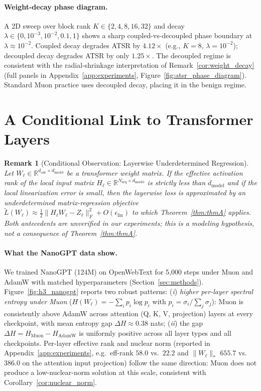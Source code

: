 \documentclass{article}
\newtheorem{remark}{Remark}
\begin{document}
\paragraph{Weight-decay phase diagram.}
A 2D sweep over block rank $K\in\{2,4,8,16,32\}$ and decay $\lambda\in\{0,10^{-3},10^{-2},0.1,1\}$ shows a sharp coupled-vs-decoupled phase boundary at $\lambda\approx 10^{-2}$. Coupled decay degrades ATSR by $4.12\times$ (e.g., $K=8$, $\lambda=10^{-2}$); decoupled decay degrades ATSR by only $1.25\times$. The decoupled regime is consistent with the radial-shrinkage interpretation of Remark~\ref{cor:weight_decay} (full panels in Appendix~\ref{app:experiments}, Figure~\ref{fig:atsr_phase_diagram}). Standard Muon practice \citep{liu2025moonlight,jordan2024muon} uses decoupled decay, placing it in the benign regime.

\section{A Conditional Link to Transformer Layers}
\label{sec:transformer}

\begin{remark}[Conditional Observation: Layerwise Underdetermined Regression]
\label{obs:transformer_link}
Let $W_\ell \in \mathbb{R}^{d_{\mathrm{out}} \times d_{\mathrm{model}}}$ be a transformer weight matrix. \emph{If} the effective activation rank of the local input matrix $H_\ell\in\mathbb R^{N_{\mathrm{seq}}\times d_{\mathrm{model}}}$ is strictly less than $d_{\mathrm{model}}$ and \emph{if} the local linearization error is small, then the layerwise loss is approximated by an underdetermined matrix-regression objective $\tilde L(W_\ell)\approx\tfrac12\|H_\ell W_\ell - Z_\ell\|_F^2 + O(\epsilon_{\mathrm{lin}})$ to which Theorem~\ref{thm:thmA} applies. Both antecedents are unverified in our experiments; this is a modeling hypothesis, not a consequence of Theorem~\ref{thm:thmA}.
\end{remark}

\paragraph{What the NanoGPT data show.}
We trained NanoGPT (124M) on OpenWebText for 5{,}000 steps under Muon and AdamW with matched hyperparameters (Section~\ref{sec:methods}). Figure~\ref{fig:h3_nanogpt} reports two robust patterns: (\emph{i}) \emph{higher per-layer spectral entropy under Muon} ($H(W_\ell) = -\sum_i p_i\log p_i$ with $p_i=\sigma_i/\sum_j\sigma_j$): Muon is consistently above AdamW across attention (Q, K, V, projection) layers at every checkpoint, with mean entropy gap $\Delta H \approx 0.38$ nats; (\emph{ii}) the gap $\Delta H = H_{\mathrm{Muon}} - H_{\mathrm{AdamW}}$ is uniformly positive across all layer types and all checkpoints. Per-layer effective rank and nuclear norm (reported in Appendix~\ref{app:experiments}, e.g.\ eff-rank $58.0$ vs.\ $22.2$ and $\|W_\ell\|_*$ $655.7$ vs.\ $386.0$ on the attention input projection) follow the same direction: Muon does not produce a low-nuclear-norm solution at this scale, consistent with Corollary~\ref{cor:nuclear_norm}.
\end{document}

